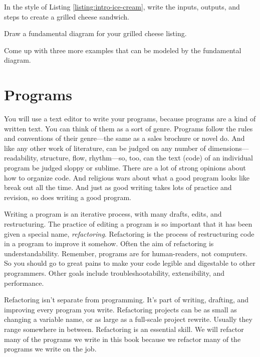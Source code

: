 \begin{question}
In the style of Listing \ref{listing:intro-ice-cream}, write the inputs,
outputs, and steps to create a grilled cheese sandwich.
\end{question}

\begin{question}
  Draw a fundamental diagram for your grilled cheese listing.
\end{question}

\begin{question}
Come up with three more examples that can be modeled by the fundamental diagram.\end{question}

\section{Programs}
You will use a text editor to write your programs, because programs are a kind
of written text. You can think of them as a sort of genre. Programs follow the
rules and conventions of their genre---the same as a sales brochure or novel do.
And like any other work of literature, can be judged on any number of
dimensions---readability, structure, flow, rhythm---so, too, can the text (code)
of an individual program be judged sloppy or sublime. There are a lot of strong
opinions about how to organize code. And religious wars about what a good
program looks like break out all the time. And just as good writing takes lots
of practice and revision, so does writing a good program.

Writing a program is an iterative process, with many drafts, edits, and
restructuring. The practice of editing a program is so important that it has
been given a special name, \emph{refactoring}. Refactoring is the process of
restructuring code in a program to improve it somehow. Often the aim of
refactoring is understandability. Remember, programs are for human-readers, not
computers.  So you should go to great pains to make
your code legible and digestable to other programmers. Other goals include
troubleshootability, extensibility, and performance.

Refactoring isn't separate from programming. It's part of writing, drafting, and
improving every program you write. Refactoring projects can be as small as
changing a variable name, or as large as a full-scale project rewrite. Usually
they range somewhere in between. Refactoring is an essential skill. We will
refactor many of the programs we write in this book because we refactor many of
the programs we write on the job.

